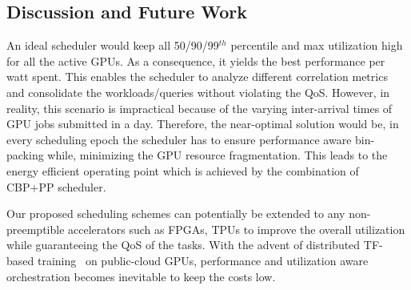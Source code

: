 

\subsection{Discussion and Future Work}
\label{sec:overall}

An ideal scheduler would keep all 50/90/99$^{th}$ percentile and max utilization high for all the active GPUs. As a consequence, it yields the best performance per watt spent. This enables the scheduler to analyze different correlation metrics and consolidate the workloads/queries without violating the QoS. However, in reality, this scenario is impractical because of the varying inter-arrival times of GPU jobs submitted in a day. Therefore, the near-optimal solution would be, in every scheduling epoch the scheduler has to ensure performance aware bin-packing while, minimizing the GPU resource fragmentation. This leads to the energy efficient operating point which is achieved by the combination of CBP+PP scheduler.

Our proposed scheduling schemes can potentially be extended to any non-preemptible accelerators such as FPGAs, TPUs to improve the overall utilization while guaranteeing the QoS of the tasks. With the advent of distributed TF-based training~\cite{peng2018optimus,zhang2017slaq,qiao2017litz} on public-cloud GPUs, performance and utilization aware orchestration becomes inevitable to keep the costs low.  



